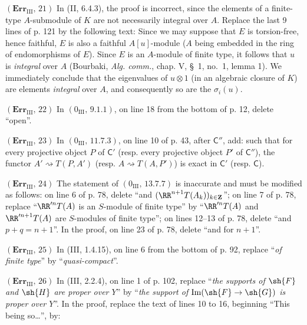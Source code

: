 \noindent\textbf{$(\mathbf{Err}_{\mathrm{III}},\,21)$} In (II, 6.4.3), the
proof is incorrect, since the elements of a finite-type $A$-submodule of $K$
are not necessarily integral over $A$. Replace the last 9 lines of p. 121 by
the following text: Since we may suppose that $E$ is torsion-free, hence
faithful, $E$ is also a faithful $A[u]$-module ($A$ being embedded in the
ring of endomorphisms of $E$). Since $E$ is an $A$-module of finite type, it
follows that $u$ is \emph{integral} over $A$ (Bourbaki, \emph{Alg. comm.},
chap. V, \S~1, no.~1, lemma 1). We immediately conclude that the eigenvalues
of $u\otimes1$ (in an algebraic closure of $K$) are elements \emph{integral}
over $A$, and consequently so are the $\sigma_i(u)$.

\noindent\textbf{$(\mathbf{Err}_{\mathrm{III}},\,22)$} In
$(0_{\mathrm{III}},\,9.1.1)$, on line 18 from the bottom of p. 12, delete
``open''.

\noindent\textbf{$(\mathbf{Err}_{\mathrm{III}},\,23)$} In
$(0_{\mathrm{III}},\,11.7.3)$, on line 10 of p. 43, after $\mathsf C''$, add:
such that for every projective object $P$ of $\mathsf C'$ (resp. every
projective object $P'$ of $\mathsf C''$), the functor
$A'\rightsquigarrow T(P,A')$ (resp. $A\rightsquigarrow T(A,P')$) is exact in
$\mathsf C'$ (resp. $\mathsf C$).

\noindent\textbf{$(\mathbf{Err}_{\mathrm{III}},\,24)$} The statement of
$(0_{\mathrm{III}},\,13.7.7)$ is inaccurate and must be modified as follows:
on line 6 of p. 78, delete ``and
$(\RR^{n+1}T(A_k))_{k\in\mathbf Z}$''; on line 7 of p. 78, replace
``$\RR'^nT(A)$ is an $S$-module of finite type'' by ``$\RR'^nT(A)$ and
$\RR'^{n+1}T(A)$ are $S$-modules of finite type''; on lines 12--13 of p. 78,
delete ``and $p+q=n+1$''. In the proof, on line 23 of p. 78, delete ``and for
$n+1$''.

\noindent\textbf{$(\mathbf{Err}_{\mathrm{III}},\,25)$} In (III, 1.4.15), on
line 6 from the bottom of p. 92, replace ``\emph{of finite type}'' by
``\emph{quasi-compact}''.

\noindent\textbf{$(\mathbf{Err}_{\mathrm{III}},\,26)$} In (III, 2.2.4), on
line 1 of p. 102, replace ``\emph{the supports of $\sh{F}$ and $\sh{H}$ are
proper over $Y$}'' by ``\emph{the support of
$\operatorname{Im}(\sh{F}\to\sh{G})$ is proper over $Y$}''. In the proof,
replace the text of lines 10 to 16, beginning ``This being so\ldots{}'', by:

